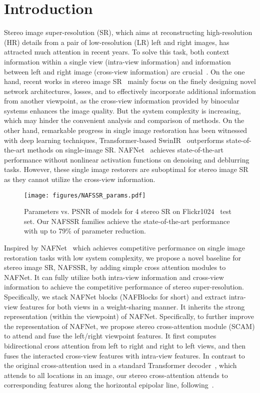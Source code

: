 \documentclass[10pt,twocolumn,letterpaper]{article}
\begin{document}
 \section{Introduction}
Stereo image super-resolution (SR), which aims at reconstructing high-resolution (HR) details from a pair of low-resolution (LR) left and right images, has attracted much attention in recent years. To solve this task, both context information within a single view (\ie intra-view information) and information between left and right image (\ie cross-view information) are crucial~\cite{ying2020stereo}. 
 On the one hand, recent works in stereo image SR~\cite{wang2021symmetric, zhu2021cross, dai2021feedback} mainly focus on the finely designing novel network architectures, losses, and \etc to effectively incorporate additional information from another viewpoint, as the cross-view information provided by binocular systems enhances the image quality. But the system complexity is increasing, which may hinder the convenient analysis and comparison of methods. On the other hand, remarkable progress in single image restoration has been witnessed with deep learning techniques, \eg Transformer-based SwinIR~\cite{liang2021swinir} outperforms state-of-the-art methods on single-image SR. NAFNet~\cite{chen2022simple} achieves state-of-the-art performance without nonlinear activation functions on denoising and deblurring tasks. However, these single image restorers are suboptimal for stereo image SR as they cannot utilize the cross-view information.

\begin{figure}[t]
	\centering
	\texttt{[image: figures/NAFSSR\_params.pdf]}
	\vspace{-4mm}
	\caption{Parameters vs. PSNR of models for 4 stereo SR on Flickr1024~\cite{wang2019flickr1024} test set.
	Our NAFSSR families achieve the state-of-the-art performance with up to 79\% of parameter reduction.
   }
\label{fig:nafssr-params}
\end{figure}

Inspired by NAFNet~\cite{chen2022simple} which achieves competitive performance on single image restoration tasks with low system complexity, we propose a novel baseline for stereo image SR, NAFSSR, by adding simple cross attention modules to NAFNet.
It can fully utilize both intra-view information and cross-view information to achieve the competitive performance of stereo super-resolution. Specifically, we stack NAFNet blocks (NAFBlocks for short) and extract intra-view features for both views in a weight-sharing manner.
It inherits the strong representation (within the viewpoint) of NAFNet. 
Specifically, to further improve the representation of NAFNet, we propose stereo cross-attention module (SCAM) to attend and fuse the left/right viewpoint features. It first computes bidirectional cross attention from left to right and right to left views, and then fuses the interacted cross-view features with intra-view features.
In contrast to the original cross-attention used in a standard Transformer decoder~\cite{vaswani2017attention}, which attends to all locations in an image, our stereo cross-attention attends to corresponding features along the horizontal epipolar line, following~\cite{wang2019learning,wang2021symmetric}. 
\end{document}
